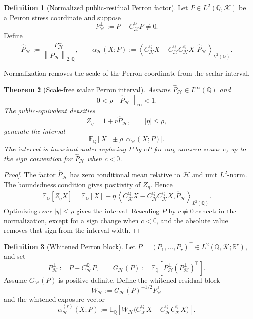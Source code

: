 \documentclass[11pt,a4paper]{amsart}
\theoremstyle{plain}
\newtheorem{theorem}{Theorem}[section]
\theoremstyle{definition}
\newtheorem{definition}[theorem]{Definition}
\theoremstyle{remark}
\newcommand{\R}{\mathbb{R}}
\newcommand{\QQ}{\mathbb{Q}}
\newcommand{\EE}{\mathbb{E}}
\newcommand{\cH}{\mathcal{H}}
\newcommand{\cK}{\mathcal{K}}
\newcommand{\norm}[1]{\left\lVert #1\right\rVert}
\newcommand{\ip}[2]{\left\langle #1,#2\right\rangle}
\begin{document}
\begin{definition}[Normalized public-residual Perron factor]\label{def:normalized-perron-factor}
Let \(P\in L^2(\QQ,\cK)\) be a Perron stress coordinate and suppose
\[
        P_{\cH}^{\perp}:=P-C_{\cH}^{\QQ}P\ne0.
\]
Define
\[
        \widehat P_{\cH}
        :=
        \frac{P_{\cH}^{\perp}}{\norm{P_{\cH}^{\perp}}_{2,\QQ}},
        \qquad
        \alpha_{\cH}(X;P)
        :=
        \ip{C_{\cK}^{\QQ}X-C_{\cH}^{\QQ}C_{\cK}^{\QQ}X}
        {\widehat P_{\cH}}_{L^2(\QQ)}.
\]
\end{definition}

Normalization removes the scale of the Perron coordinate from the scalar interval.

\begin{theorem}[Scale-free scalar Perron interval]\label{thm:scale-free-perron-interval}
Assume \(\widehat P_{\cH}\in L^\infty(\QQ)\) and
\[
        0<\rho\norm{\widehat P_{\cH}}_\infty<1.
\]
The public-equivalent densities
\[
        Z_\eta=1+\eta\widehat P_{\cH},
        \qquad |\eta|\le\rho,
\]
generate the interval
\[
        \EE_\QQ[X]\pm\rho\,|\alpha_{\cH}(X;P)|.
\]
The interval is invariant under replacing \(P\) by \(cP\) for any nonzero scalar \(c\), up to the
sign convention for \(\widehat P_{\cH}\) when \(c<0\).
\end{theorem}

\begin{proof}
The factor \(\widehat P_{\cH}\) has zero conditional mean relative to \(\cH\) and unit
\(L^2\)-norm.  The boundedness condition gives positivity of \(Z_\eta\).  Hence
\[
        \EE_\QQ[Z_\eta X]
        =
        \EE_\QQ[X]
        +
        \eta\,
        \ip{C_{\cK}^{\QQ}X-C_{\cH}^{\QQ}C_{\cK}^{\QQ}X}
        {\widehat P_{\cH}}_{L^2(\QQ)}.
\]
Optimizing over \(|\eta|\le\rho\) gives the interval.  Rescaling \(P\) by \(c\ne0\) cancels in the
normalization, except for a sign change when \(c<0\), and the absolute value removes that sign from
the interval width.
\end{proof}

\begin{definition}[Whitened Perron block]\label{def:whitened-perron-block}
Let \(P=(P_1,\ldots,P_r)^\top\in L^2(\QQ,\cK;\R^r)\), and set
\[
        P_{\cH}^{\perp}:=P-C_{\cH}^{\QQ}P,
        \qquad
        G_{\cH}(P):=\EE_\QQ[P_{\cH}^{\perp}(P_{\cH}^{\perp})^\top].
\]
Assume \(G_{\cH}(P)\) is positive definite.  Define the whitened residual block
\[
        W_{\cH}:=G_{\cH}(P)^{-1/2}P_{\cH}^{\perp}
\]
and the whitened exposure vector
\[
        \alpha_{\cH}^{(r)}(X;P)
        :=
        \EE_\QQ\!\left[
        W_{\cH}\bigl(C_{\cK}^{\QQ}X-C_{\cH}^{\QQ}C_{\cK}^{\QQ}X\bigr)
        \right].
\]
\end{definition}
\end{document}
